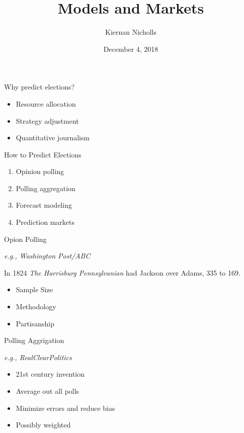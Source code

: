 \documentclass[ignorenonframetext,]{beamer}
\title{Models and Markets}
\author{Kiernan Nicholls}
\date{December 4, 2018}
\providecommand{\tightlist}{%
  \setlength{\itemsep}{0pt}\setlength{\parskip}{0pt}}
\begin{document}
\frame{\titlepage}

\begin{frame}{Why predict elections?}

\begin{itemize}
\tightlist
\item
  Resource allocation
\item
  Strategy adjustment
\item
  Quantitative journalism
\end{itemize}

\end{frame}

\begin{frame}{How to Predict Elections}

\begin{enumerate}
\def\labelenumi{\arabic{enumi}.}
\tightlist
\item
  Opinion polling
\item
  Polling aggregation
\item
  Forecast modeling
\item
  Prediction markets
\end{enumerate}

\end{frame}

\begin{frame}{Opion Polling}

\emph{e.g., Washington Post/ABC}

In 1824 \emph{The Harrisburg Pennsylvanian} had Jackson over Adams, 335
to 169.

\begin{itemize}
\tightlist
\item
  Sample Size
\item
  Methodology
\item
  Partisanship
\end{itemize}

\end{frame}

\begin{frame}{Polling Aggrigation}

\emph{e.g., RealClearPolitics}

\begin{itemize}
\tightlist
\item
  21st century invention
\item
  Average out all polls
\item
  Minimize errors and reduce bias
\item
  Possibly weighted
\end{itemize}

\end{frame}
\end{document}
